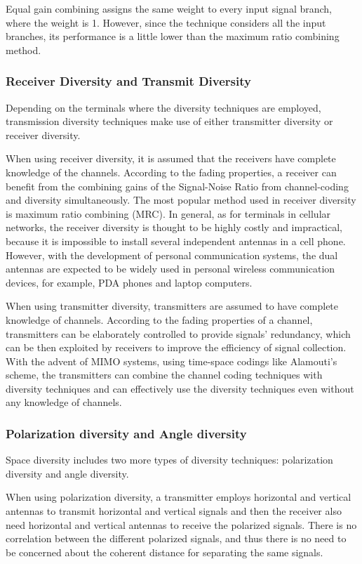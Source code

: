 Equal gain combining assigns the same weight to every input signal
branch, where the weight is 1. However, since the technique
considers all the input branches, its performance is a little lower
than the maximum ratio combining method.

\subsubsection{Receiver Diversity and Transmit Diversity}
Depending on the terminals where the diversity techniques are
employed, transmission diversity techniques make use of either
transmitter diversity or receiver diversity.

When using receiver diversity, it is assumed that the receivers have
complete knowledge of the channels. According to the fading
properties, a receiver can benefit from the combining gains of the
Signal-Noise Ratio from channel-coding and diversity simultaneously.
The most popular method used in receiver diversity is maximum ratio
combining (MRC). In general, as for terminals in cellular networks,
the receiver diversity is thought to be highly costly and
impractical, because it is impossible to install several independent
antennas in a cell phone. However, with the development of personal
communication systems, the dual antennas are expected to be widely
used in personal wireless communication devices, for example, PDA
phones and laptop computers.

When using transmitter diversity, transmitters are assumed to have
complete knowledge of channels. According to the fading properties
of a channel, transmitters can be elaborately controlled to provide
signals' redundancy, which can be then exploited by receivers to
improve the efficiency of signal collection. With the advent of MIMO
systems, using time-space codings like Alamouti's scheme, the
transmitters can combine the channel coding techniques with
diversity techniques and can effectively use the diversity
techniques even without any knowledge of channels.

\subsubsection{Polarization diversity and Angle diversity}
Space diversity includes two more types of diversity techniques:
polarization diversity and angle diversity.

When using polarization diversity, a transmitter employs horizontal
and vertical antennas to transmit horizontal and vertical signals
and then the receiver also need horizontal and vertical antennas to
receive the polarized signals. There is no correlation between the
different polarized signals, and thus there is no need to be
concerned about the coherent distance for separating the same
signals.


